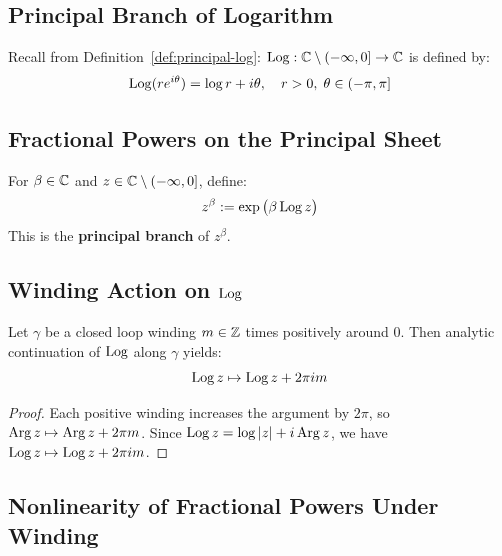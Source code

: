 \subsection{Principal Branch of Logarithm}

\begin{definition}\label{def:Log}
Recall from Definition~\ref{def:principal-log}: $\operatorname{Log}: \mathbb{C} \setminus (-\infty, 0] \to \mathbb{C}$ is defined by:
\begin{equation}
\operatorname{Log}(r e^{i\theta}) = \log r + i\theta, \quad r > 0, \; \theta \in (-\pi, \pi]
\end{equation}
\end{definition}

\subsection{Fractional Powers on the Principal Sheet}

\begin{definition}\label{def:fractional-power}
For $\beta \in \mathbb{C}$ and $z \in \mathbb{C} \setminus (-\infty, 0]$, define:
\begin{equation}
z^{\beta} := \exp\big(\beta \operatorname{Log} z\big)
\end{equation}
This is the \textbf{principal branch} of $z^{\beta}$.
\end{definition}

\subsection{Winding Action on \texorpdfstring{$\operatorname{Log}$}{Log}}

\begin{lemma}\label{lem:winding-log}
Let $\gamma$ be a closed loop winding $m \in \mathbb{Z}$ times positively around $0$. Then analytic continuation of $\operatorname{Log}$ along $\gamma$ yields:
\begin{equation}
\operatorname{Log} z \mapsto \operatorname{Log} z + 2\pi i m
\end{equation}
\end{lemma}

\begin{proof}
Each positive winding increases the argument by $2\pi$, so $\operatorname{Arg} z \mapsto \operatorname{Arg} z + 2\pi m$. Since $\operatorname{Log} z = \log |z| + i \operatorname{Arg} z$, we have $\operatorname{Log} z \mapsto \operatorname{Log} z + 2\pi i m$.
\end{proof}

\subsection{Nonlinearity of Fractional Powers Under Winding}

